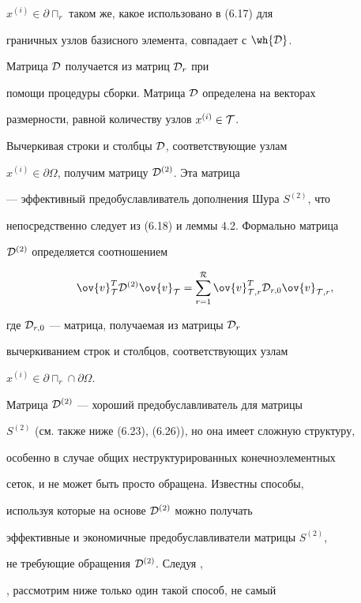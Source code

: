$x^{(i)}\in \partial\sqcap_r$ таком же, какое использовано в (6.17) для 


граничных узлов базисного элемента, совпадает с $\wh{{\cal D}}$.


Матрица ${\cal D}$ получается из матриц ${{\cal D}}_r$ при 


помощи процедуры сборки. Матрица ${\cal D}$ определена на векторах 


размерности, равной количеству узлов $x^{(i)}\in {\cal T}$.


Вычеркивая строки и столбцы ${\cal D}$, соответствующие узлам 


$x^{(i)}\in\partial\Omega$, получим матрицу ${\cal D}^{(2)}$. Эта матрица


--- эффективный предобуславливатель дополнения Шура $S^{(2)}$, что 


непосредственно следует из (6.18) и леммы 4.2. Формально матрица 


${\cal D}^{(2)}$ определяется соотношением 


$$


\ov{v}^T_{\cal T} {\cal D}^{(2)} \ov{v}_{\cal T} =


\sum^{\cal R}_{r=1} \ov{v}^T_{{\cal T},r} {\cal D}_{r,0}


\ov{v}_{{\cal T},r},


$$


где ${\cal D}_{r,0}$ --- матрица, получаемая из матрицы ${\cal D}_r$


вычеркиванием строк и столбцов, соответствующих узлам


$x^{(i)}\in \partial\sqcap_r \cap \partial\Omega$.





Матрица ${\cal D}^{(2)}$ --- хороший предобуславливатель для матрицы 


$S^{(2)}$ (см. также ниже (6.23), (6.26)), но она имеет сложную структуру, 


особенно в случае общих неструктурированных конечноэлементных 


сеток, и не может быть просто обращена. Известны способы, 


используя которые на основе ${\cal D}^{(2)}$ можно получать 


эффективные и экономичные предобуславливатели матрицы $S^{(2)}$, 


не требующие обращения ${\cal D}^{(2)}$. Следуя \cite{iva-kor1},


\cite{nepom}, рассмотрим ниже только один такой способ, не самый 


